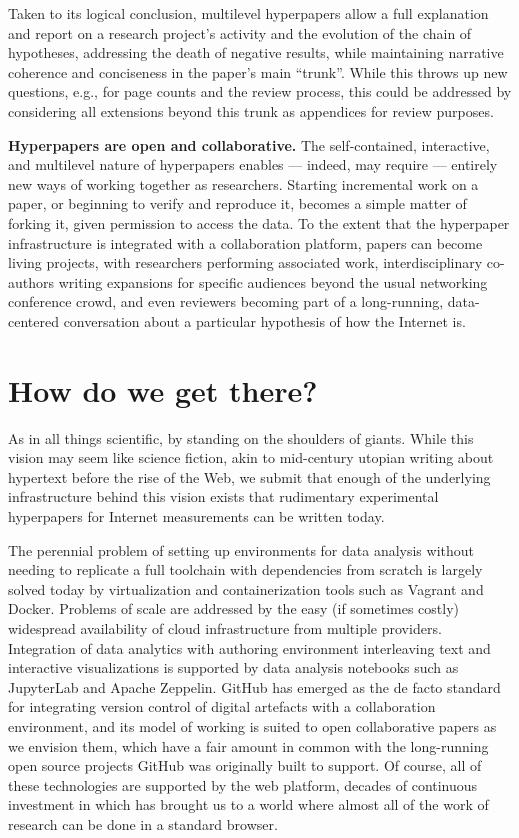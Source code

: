 \documentclass[sigconf]{acmart}
\begin{document}
Taken to its logical conclusion, multilevel hyperpapers allow a full explanation
and report on a research project’s activity and the evolution of the chain of
hypotheses, addressing the death of negative results, while maintaining
narrative coherence and conciseness in the paper’s main “trunk”. While this
throws up new questions, e.g., for page counts and the review process, this
could be addressed by considering all extensions beyond this trunk as appendices
for review purposes.

\textbf{Hyperpapers are open and collaborative.}  The self-contained,
interactive, and multilevel nature of hyperpapers enables — indeed, may require
— entirely new ways of working together as researchers. Starting incremental
work on a paper, or beginning to verify and reproduce it, becomes a simple
matter of forking it, given permission to access the data. To the extent that
the hyperpaper infrastructure is integrated with a collaboration platform,
papers can become living projects, with researchers performing associated work,
interdisciplinary co-authors writing expansions for specific audiences beyond
the usual networking conference crowd, and even reviewers becoming part of a
long-running, data-centered conversation about a particular hypothesis of how
the Internet is.

\section{How do we get there?}\label{sec:how}

As in all things scientific, by standing on the shoulders of giants. While this
vision may seem like science fiction, akin to mid-century utopian writing about
hypertext before the rise of the Web, we submit that enough of the underlying
infrastructure behind this vision exists that rudimentary experimental
hyperpapers for Internet measurements can be written today.

The perennial problem of setting up environments for data analysis without
needing to replicate a full toolchain with dependencies from scratch is largely
solved today by virtualization and containerization tools such as Vagrant and
Docker. Problems of scale are addressed by the easy (if sometimes costly)
widespread availability of cloud infrastructure from multiple providers.
Integration of data analytics with authoring environment interleaving text and
interactive visualizations is supported by data analysis notebooks such as
JupyterLab and Apache Zeppelin. GitHub has emerged as the de facto standard for
integrating version control of digital artefacts with a collaboration
environment, and its model of working is suited to open collaborative papers as
we envision them, which have a fair amount in common with the long-running open
source projects GitHub was originally built to support. Of course, all of these
technologies are supported by the web platform, decades of continuous investment
in which has brought us to a world where almost all of the work of research can
be done in a standard browser.
\end{document}
